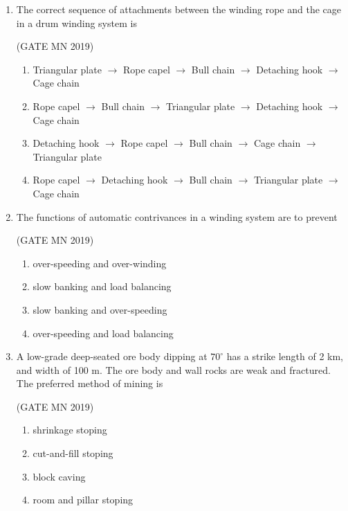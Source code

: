\documentclass[journal]{IEEEtran}
\begin{document}
\begin{enumerate}
\item The correct sequence of attachments between the winding rope and the cage in a drum winding system is


	\hfill(GATE MN 2019)
\begin{enumerate}
\item Triangular plate $\rightarrow$ Rope capel $\rightarrow$ Bull chain $\rightarrow$ Detaching hook $\rightarrow$ Cage chain
\item Rope capel $\rightarrow$ Bull chain $\rightarrow$ Triangular plate $\rightarrow$ Detaching hook $\rightarrow$ Cage chain
\item Detaching hook $\rightarrow$ Rope capel $\rightarrow$ Bull chain $\rightarrow$ Cage chain $\rightarrow$ Triangular plate
\item Rope capel $\rightarrow$ Detaching hook $\rightarrow$ Bull chain $\rightarrow$ Triangular plate $\rightarrow$ Cage chain
\end{enumerate}



\item The functions of automatic contrivances in a winding system are to prevent


	\hfill(GATE MN 2019)
\begin{enumerate}
\item over-speeding and over-winding
\item slow banking and load balancing
\item slow banking and over-speeding
\item over-speeding and load balancing
\end{enumerate}



\item A low-grade deep-seated ore body dipping at $70^\circ$ has a strike length of 2 km, and width of 100 m. The ore body and wall rocks are weak and fractured. The preferred method of mining is



	\hfill(GATE MN 2019)
\begin{enumerate}
\item shrinkage stoping
\item cut-and-fill stoping
\item block caving
\item room and pillar stoping
\end{enumerate}




\end{enumerate}
\end{document}
